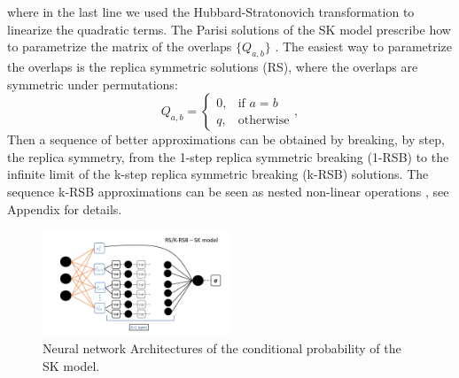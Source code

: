 \documentclass[aps,physrev,10pt,floatfix,reprint]{revtex4-2}
\begin{document}
where in the last line we used the Hubbard-Stratonovich transformation to linearize the quadratic terms. 
The Parisi solutions of the SK model prescribe how to parametrize the matrix of the overlaps $\{Q_{a,b}\}$ \cite{10.1142/0271}. The easiest way to parametrize the overlaps is the replica symmetric solutions (RS), where the overlaps are symmetric under permutations: 
$$
Q_{a,b}=\begin{cases}
			0, & \text{if $a=b$}\\
            q, & \text{otherwise}
		 \end{cases},
$$
Then a sequence of better approximations can be obtained by breaking, by step, the replica symmetry, from the 1-step replica symmetric breaking (1-RSB) to the infinite limit of the k-step replica symmetric breaking (k-RSB) solutions. 
The sequence k-RSB approximations can be seen as nested non-linear operations \cite{Parisi_1980}, see Appendix for details. 
\begin{figure}[!h]
    \centering 
    \includegraphics[width=0.5\textwidth]{img/SK_arch.pdf}
    \caption{Neural network Architectures of the conditional probability of the SK model.}
    \label{fig:SK_arch}
\end{figure}
\end{document}
